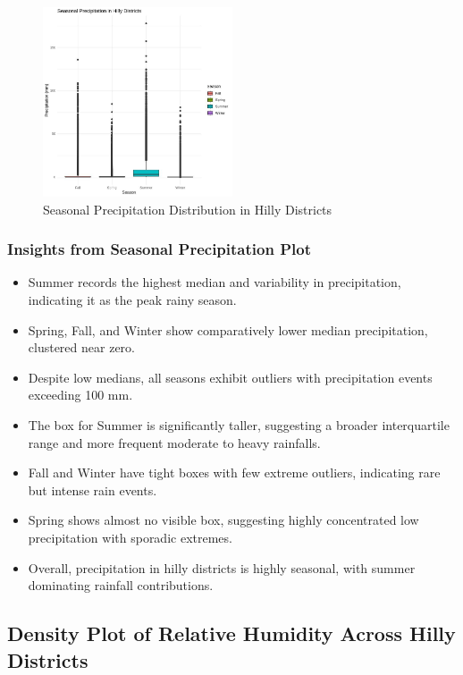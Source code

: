 \begin{figure}[h]
    \centering
    \includegraphics[width=0.5\textwidth]{figures/box_hilly.jpg}
    \caption{Seasonal Precipitation Distribution in Hilly Districts}
\end{figure}

\subsubsection*{Insights from Seasonal Precipitation Plot}

\begin{itemize}
    \item Summer records the highest median and variability in precipitation, indicating it as the peak rainy season.
    \item Spring, Fall, and Winter show comparatively lower median precipitation, clustered near zero.
    \item Despite low medians, all seasons exhibit outliers with precipitation events exceeding 100 mm.
    \item The box for Summer is significantly taller, suggesting a broader interquartile range and more frequent moderate to heavy rainfalls.
    \item Fall and Winter have tight boxes with few extreme outliers, indicating rare but intense rain events.
    \item Spring shows almost no visible box, suggesting highly concentrated low precipitation with sporadic extremes.
    \item Overall, precipitation in hilly districts is highly seasonal, with summer dominating rainfall contributions.
\end{itemize}

\subsection*{Density Plot of Relative Humidity Across Hilly Districts}


